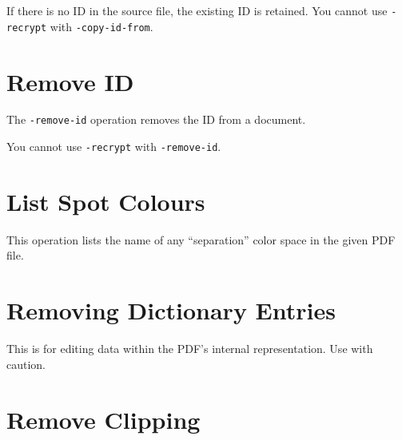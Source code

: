 \documentclass{book}
\begin{document}
  \noindent If there is no ID in the source file, the existing ID is retained. You cannot use \texttt{-recrypt} with \texttt{-copy-id-from}.

\section{Remove ID}
  The \texttt{-remove-id} operation removes the ID from a document.

\noindent{}

You cannot use \texttt{-recrypt} with \texttt{-remove-id}.

\section{List Spot Colours}

This operation lists the name of any ``separation'' color space in the given PDF file.

\noindent{}

\section{Removing Dictionary Entries}

This is for editing data within the PDF's internal representation. Use with caution.

\noindent{}


\section{Remove Clipping}
\end{document}
